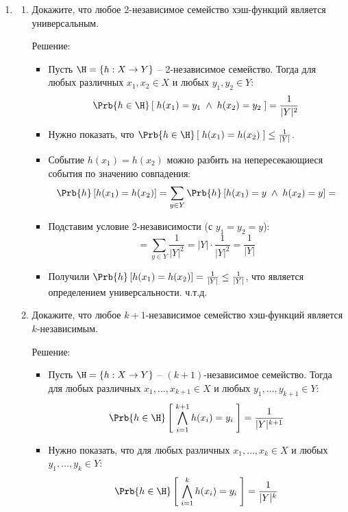 \begin{enumerate}

  \item
    \begin{enumerate}
   \item Докажите, что любое 2-независимое семейство хэш-функций является универсальным.

      Решение:

      \begin{itemize}
        \item Пусть $\H = \{ h : X \to Y \}$ -- 2-независимое семейство. 
        Тогда для любых различных $x_1, x_2 \in X$ и любых $y_1, y_2 \in Y$:
        $$\Prb{h \in \H}\left[ \; h(x_1) = y_1 \;\wedge\; h(x_2) = y_2 \; \right] = \frac{1}{|Y|^2}$$

        \item Нужно показать, что $\Prb{h \in \H}\left[ \; h(x_1) = h(x_2) \; \right] \leq \frac{1}{|Y|}$.

        \item Событие $h(x_1) = h(x_2)$ можно разбить на непересекающиеся события по значению совпадения:
        $$\Prb{h}\left[ h(x_1) = h(x_2) \right] = \sum_{y \in Y} \Prb{h}\left[ h(x_1) = y \;\wedge\; h(x_2) = y \right] = $$

        \item Подставим условие 2-независимости (с $y_1 = y_2 = y$):
        $$= \sum_{y \in Y} \frac{1}{|Y|^2} = |Y| \cdot \frac{1}{|Y|^2} = \frac{1}{|Y|}$$

        \item Получили $\Prb{h}\left[ h(x_1) = h(x_2) \right] = \frac{1}{|Y|} \leq \frac{1}{|Y|}$, 
        что является определением универсальности. ч.т.д.
      \end{itemize}

   \item Докажите, что любое $k+1$-независимое семейство хэш-функций является $k$-независимым.

      Решение:

      \begin{itemize}
        \item Пусть $\H = \{ h : X \to Y \}$ -- $(k+1)$-независимое семейство. 
        Тогда для любых различных $x_1, \ldots, x_{k+1} \in X$ и любых $y_1, \ldots, y_{k+1} \in Y$:
        $$\Prb{h \in \H}\left[ \; \bigwedge_{i=1}^{k+1} h(x_i) = y_i \; \right] = \frac{1}{|Y|^{k+1}}$$

        \item Нужно показать, что для любых различных $x_1, \ldots, x_k \in X$ и любых $y_1, \ldots, y_k \in Y$:
        $$\Prb{h \in \H}\left[ \; \bigwedge_{i=1}^{k} h(x_i) = y_i \; \right] = \frac{1}{|Y|^k}$$


\end{itemize}
\end{enumerate}
\end{enumerate}
